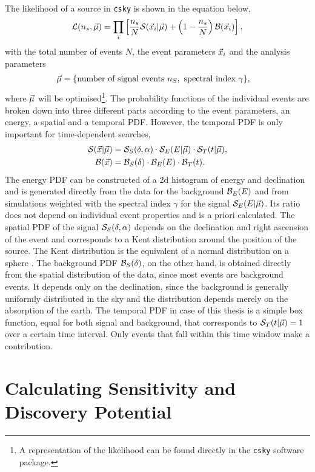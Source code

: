 The likelihood of a source in \texttt{csky} is shown in the equation below,
\begin{equation}
  \mathcal{L}(n_s,\vec{\mu})
  = \prod_i \left[ 
    \frac{n_s}{N} \mathcal{S}(\vec{x}_i|\vec{\mu})
    + \left( 1 - \frac{n_s}{N} \right) \mathcal{B}(\vec{x}_i)
   \right],
  \label{eq:lh}
\end{equation}
with the total number of events $N$, the event parameters $\vec{x}_i$ and the analysis parameters
\begin{align}
  \vec{\mu} &= \{\text{number of signal events }n_S, \text{ spectral index }\gamma\},
\end{align}
where $\vec{\mu}$ will be optimised\footnote{A representation of the likelihood can be found directly in the \texttt{csky} software package.}.
The probability functions of the individual events are broken down into three different parts according to the event parameters, an energy, a spatial and a temporal PDF.
However, the temporal PDF is only important for time-dependent searches,
\begin{align}
  \mathcal{S}(\vec{x}|\vec{\mu})
  &= \mathcal{S}_S(\delta,\alpha)
  \cdot \mathcal{S}_E(E|\vec{\mu})
  \cdot \mathcal{S}_T(t|\vec{\mu}), \label{eq:signal_pdfs}
  \\
  \mathcal{B}(\vec{x})
  &= \mathcal{B}_S(\delta)
  \cdot \mathcal{B}_E(E)
  \cdot \mathcal{B}_T(t).
  \label{eq:background_pdfs}
\end{align}
The energy PDF can be constructed of a 2d histogram of energy and declination and is generated directly from the data for the background $\mathcal{B}_E(E)$ and from simulations weighted with the spectral index $\gamma$ for the signal $\mathcal{S}_E(E|\vec{\mu})$.
Its ratio does not depend on individual event properties and is a priori calculated.
The spatial PDF of the signal $\mathcal{S}_S(\delta,\alpha)$ depends on the declination and right ascension of the event and corresponds to a Kent distribution around the position of the source.
The Kent distribution is the equivalent of a normal distribution on a sphere \cite{kent}.
The background PDF $\mathcal{B}_S(\delta)$, on the other hand, is obtained directly from the spatial distribution of the data, since most events are background events.
It depends only on the declination, since the background is generally uniformly distributed in the sky and the distribution depends merely on the absorption of the earth.
The temporal PDF in case of this thesis is a simple box function, equal for both signal and background, that corresponds to $\mathcal{S}_T(t|\vec{\mu})=1$ over a certain time interval.
Only events that fall within this time window make a contribution.

\section{Calculating Sensitivity and Discovery Potential}

